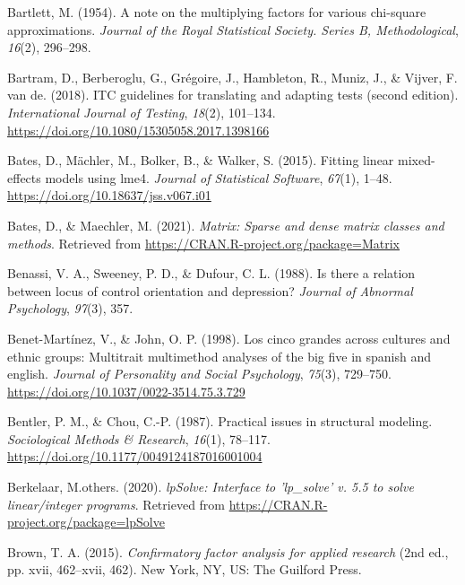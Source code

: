 \documentclass[
  english,
  man]{apa6}
\newlength{\cslhangindent}
\newlength{\cslentryspacingunit} %
\newenvironment{CSLReferences}[2] %
 {%
  \setlength{\parindent}{0pt}
  \ifodd #1
  \let\oldpar\par
  \def\par{\hangindent=\cslhangindent\oldpar}
  \fi
  \setlength{\parskip}{#2\cslentryspacingunit}
 }%
 {}
\begin{document}
\begin{CSLReferences}{1}{0}
\leavevmode{}%
Bartlett, M. (1954). A note on the multiplying factors for various chi-square approximations. \emph{Journal of the Royal Statistical Society. Series B, Methodological}, \emph{16}(2), 296--298.

\leavevmode{}%
Bartram, D., Berberoglu, G., Grégoire, J., Hambleton, R., Muniz, J., \& Vijver, F. van de. (2018). ITC guidelines for translating and adapting tests (second edition). \emph{International Journal of Testing}, \emph{18}(2), 101--134. \url{https://doi.org/10.1080/15305058.2017.1398166}

\leavevmode{}%
Bates, D., Mächler, M., Bolker, B., \& Walker, S. (2015). Fitting linear mixed-effects models using {lme4}. \emph{Journal of Statistical Software}, \emph{67}(1), 1--48. \url{https://doi.org/10.18637/jss.v067.i01}

\leavevmode{}%
Bates, D., \& Maechler, M. (2021). \emph{Matrix: Sparse and dense matrix classes and methods}. Retrieved from \url{https://CRAN.R-project.org/package=Matrix}

\leavevmode{}%
Benassi, V. A., Sweeney, P. D., \& Dufour, C. L. (1988). Is there a relation between locus of control orientation and depression? \emph{Journal of Abnormal Psychology}, \emph{97}(3), 357.

\leavevmode{}%
Benet-Martínez, V., \& John, O. P. (1998). Los cinco grandes across cultures and ethnic groups: Multitrait multimethod analyses of the big five in spanish and english. \emph{Journal of Personality and Social Psychology}, \emph{75}(3), 729--750. \url{https://doi.org/10.1037/0022-3514.75.3.729}

\leavevmode{}%
Bentler, P. M., \& Chou, C.-P. (1987). Practical issues in structural modeling. \emph{Sociological Methods \& Research}, \emph{16}(1), 78--117. \url{https://doi.org/10.1177/0049124187016001004}

\leavevmode{}%
Berkelaar, M.others. (2020). \emph{lpSolve: Interface to 'lp\_solve' v. 5.5 to solve linear/integer programs}. Retrieved from \url{https://CRAN.R-project.org/package=lpSolve}

\leavevmode{}%
Brown, T. A. (2015). \emph{Confirmatory factor analysis for applied research} (2nd ed., pp. xvii, 462--xvii, 462). New York, NY, US: The Guilford Press.


\end{CSLReferences}
\end{document}
